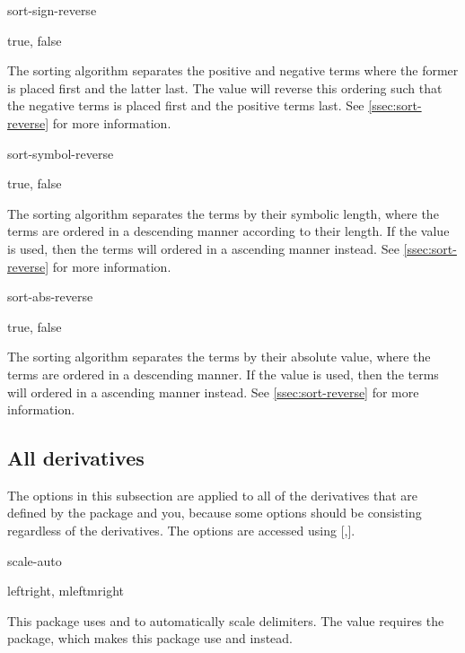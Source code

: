 \documentclass[final,british,10pt]{scrartcl}
\theoremstyle{remark}
\begin{document}
	\begin{option}{sort-sign-reverse}
		\begin{values}[default = false]
			true, false
		\end{values}
		The sorting algorithm  separates the positive and negative terms where the former is placed first and the latter last. The value  will reverse this ordering such that the negative terms is placed first and the positive terms last. See \cref{ssec:sort-reverse} for more information.
	\end{option}
	
	\begin{option}{sort-symbol-reverse}
		\begin{values}[default = false]
			true, false
		\end{values}
		The sorting algorithm  separates the terms by their symbolic length, where the terms are ordered in a descending manner according to their length. If the value  is used, then the terms will ordered in a ascending manner instead. See \cref{ssec:sort-reverse} for more information.
	\end{option}
	
	\begin{option}{sort-abs-reverse}
		\begin{values}[default = false]
			true, false
		\end{values}
		The sorting algorithm  separates the terms by their absolute value, where the terms are ordered in a descending manner. If the value  is used, then the terms will ordered in a ascending manner instead. See \cref{ssec:sort-reverse} for more information.
	\end{option}
	
	\subsection{All derivatives} \label{ssec:both_options}
	The options in this subsection are applied to all of the derivatives that are defined by the package and you, because some options should be consisting regardless of the derivatives. The options are accessed using \macro{\derivset}[,].
	
	\begin{option}{scale-auto}
		\begin{values}[default = leftright]
			leftright, mleftmright\req
		\end{values}
		This package uses  and  to automatically scale delimiters. The value  requires the  package, which makes this package use  and  instead.
	\end{option}
	
\end{document}
